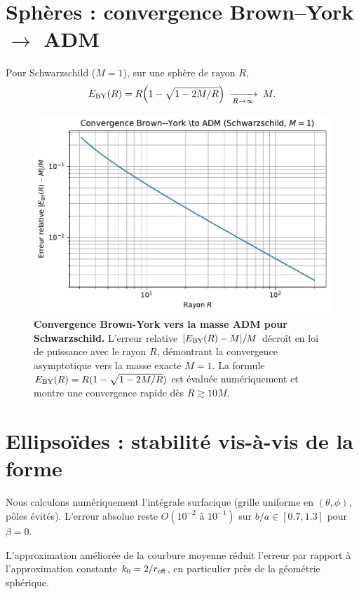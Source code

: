 \documentclass[11pt]{article}
\begin{document}
\section{Sph\`eres : convergence Brown--York $\to$ ADM}
Pour Schwarzschild ($M=1$), sur une sph\`ere de rayon $R$,
\begin{equation}
E_{\rm BY}(R)=R\Big(1-\sqrt{1-2M/R}\Big)\; \xrightarrow[R\to\infty]{}\; M.
\end{equation}
\begin{figure}[!htb]
\centering
\includegraphics[width=.75\linewidth]{fig_error_vs_radius_improved.pdf}
\caption{\textbf{Convergence Brown-York vers la masse ADM pour Schwarzschild.} L'erreur relative $|E_{\rm BY}(R)-M|/M$ décroît en loi de puissance avec le rayon $R$, démontrant la convergence asymptotique vers la masse exacte $M=1$. La formule $E_{\rm BY}(R) = R(1-\sqrt{1-2M/R})$ est évaluée numériquement et montre une convergence rapide dès $R \gtrsim 10M$.}
\end{figure}
\clearpage

\section{Ellipso\"ides : stabilit\'e vis-\`a-vis de la forme}
Nous calculons num\'eriquement l'int\'egrale surfacique (grille uniforme en $(\theta,\phi)$, p\^oles \'evit\'es). 
L'erreur absolue reste $O(10^{-2}\text{ à }10^{-1})$ sur $b/a\in[0.7,1.3]$ pour $\beta=0$.

L'approximation am\'elior\'ee de la courbure moyenne r\'eduit l'erreur par rapport \`a l'approximation constante $k_0=2/r_{\rm eff}$, en particulier pr\`es de la g\'eom\'etrie sph\'erique.
\end{document}
